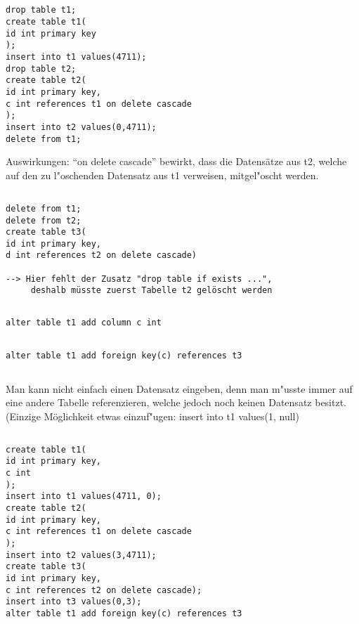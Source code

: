 \documentclass[a4paper, 11pt, titlepage]{article}
\begin{document}
\subsection{}
\begin{verbatim}
drop table t1;
create table t1(
id int primary key
);
insert into t1 values(4711);
drop table t2;
create table t2(
id int primary key,
c int references t1 on delete cascade
);
insert into t2 values(0,4711);
delete from t1;
\end{verbatim}
Auswirkungen: "`on delete cascade"' bewirkt, dass die Datensätze aus t2, welche auf den zu l"oschenden Datensatz aus t1 verweisen, mitgel"oscht werden.

\subsection{}
\begin{verbatim}
delete from t1;
delete from t2;
create table t3(
id int primary key,
d int references t2 on delete cascade)

--> Hier fehlt der Zusatz "drop table if exists ...", 
     deshalb müsste zuerst Tabelle t2 gelöscht werden
\end{verbatim}

\subsection{}
\begin{verbatim}
alter table t1 add column c int
\end{verbatim}

\subsection{}
\begin{verbatim}
alter table t1 add foreign key(c) references t3
\end{verbatim}
\subsection{}
\subsection{}
Man kann nicht einfach einen Datensatz eingeben, denn man m"usste immer auf eine andere Tabelle referenzieren, welche jedoch noch keinen Datensatz besitzt. (Einzige Möglichkeit etwas einzuf"ugen: insert into t1 values(1, null)
\subsection{}
\begin{verbatim}
create table t1(
id int primary key,
c int
);
insert into t1 values(4711, 0);
create table t2(
id int primary key,
c int references t1 on delete cascade
);
insert into t2 values(3,4711);
create table t3(
id int primary key,
c int references t2 on delete cascade);
insert into t3 values(0,3);
alter table t1 add foreign key(c) references t3
\end{verbatim}
\end{document}
